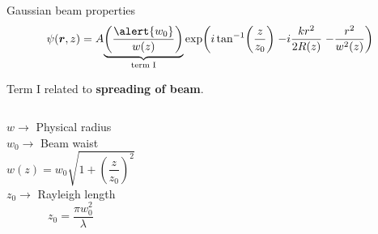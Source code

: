 \documentclass[12pt, dvipsnames]{beamer}
\numberwithin{equation}{section}
\begin{document}
\begin{frame}[t]{Gaussian beam properties}\vspace{-16pt} %
	$$\psi(\boldsymbol{r},z)=A
	{\underbrace{\left(\frac{\alert{w_0}}{w(z)}\right)}_{\text{term I}}}
	\exp(
	{i\tan[-1](\frac{z}{z_0})}\;
	{-i\frac{kr^2}{2R(z)}}\;
	{-\frac{r^2}{w^2(z)}}
	)$$
{Term I related to \textbf{spreading of beam}.\\\vspace{5pt}\pause
	\begin{columns}
	$w\rightarrow$ Physical radius\\\pause
	{\color{red}$w_0\rightarrow$ Beam waist}\pause
	$$w(z)= w_0\sqrt{1+\left(\frac{z}{z_0}\right)^2}$$\pause
	$z_0\rightarrow$ Rayleigh length
	$$ z_0 = \frac{\pi w_0^2}{\lambda}$$ 
	
	
\end{columns}}

\end{frame}
\end{document}
